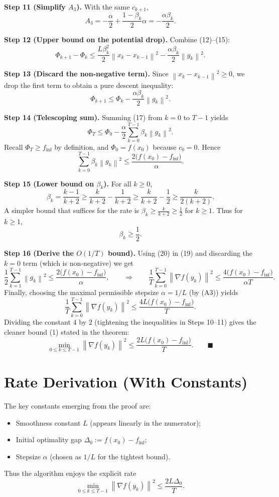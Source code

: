 \documentclass{article}
\newcommand{\norm}[1]{\left\lVert #1\right\rVert}
\begin{document}
\noindent\textbf{Step 11 (Simplify $A_3$).}  
With the same $c_{k+1}$,
\[
A_3 = -\frac{\alpha}{2} + \frac{1-\beta_k}{2}\alpha
    = -\frac{\alpha\beta_k}{2} .
\tag{15}
\]

\noindent\textbf{Step 12 (Upper bound on the potential drop).}  
Combine (12)–(15):
\[
\Phi_{k+1}-\Phi_k
\le \frac{L\beta_k^2}{2}\norm{x_k-x_{k-1}}^2
    - \frac{\alpha\beta_k}{2}\norm{g_k}^2 .
\tag{16}
\]

\noindent\textbf{Step 13 (Discard the non‑negative term).}  
Since $\norm{x_k-x_{k-1}}^2\ge0$, we drop the first term to obtain a pure descent inequality:
\[
\Phi_{k+1}\le \Phi_k - \frac{\alpha\beta_k}{2}\norm{g_k}^2 .
\tag{17}
\]

\noindent\textbf{Step 14 (Telescoping sum).}  
Summing (17) from $k=0$ to $T-1$ yields
\[
\Phi_T \le \Phi_0 - \frac{\alpha}{2}\sum_{k=0}^{T-1}\beta_k \norm{g_k}^2 .
\tag{18}
\]
Recall $\Phi_T\ge f_{\inf}$ by definition, and $\Phi_0 = f(x_0)$ because $c_0=0$. Hence
\[
\sum_{k=0}^{T-1}\beta_k \norm{g_k}^2
\le \frac{2\bigl(f(x_0)-f_{\inf}\bigr)}{\alpha}.
\tag{19}
\]

\noindent\textbf{Step 15 (Lower bound on $\beta_k$).}  
For all $k\ge0$,
\[
\beta_k = \frac{k-1}{k+2}\ge \frac{k}{k+2} -\frac{1}{k+2}
       \ge \frac{k}{k+2} -\frac{1}{2}
       \ge \frac{k}{2(k+2)} .
\]
A simpler bound that suffices for the rate is $\beta_k\ge \frac{k}{k+2}\ge \frac12$ for $k\ge1$.  
Thus for $k\ge1$,
\[
\beta_k \ge \frac12 .
\tag{20}
\]

\noindent\textbf{Step 16 (Derive the $O(1/T)$ bound).}  
Using (20) in (19) and discarding the $k=0$ term (which is non‑negative) we get
\[
\frac12\sum_{k=1}^{T-1}\norm{g_k}^2
\le \frac{2\bigl(f(x_0)-f_{\inf}\bigr)}{\alpha},
\qquad\Longrightarrow\qquad
\frac{1}{T}\sum_{k=0}^{T-1}\norm{\nabla f(y_k)}^2
\le \frac{4\bigl(f(x_0)-f_{\inf}\bigr)}{\alpha T}.
\tag{21}
\]
Finally, choosing the maximal permissible stepsize $\alpha=1/L$ (by (A3)) yields
\[
\frac{1}{T}\sum_{k=0}^{T-1}\norm{\nabla f(y_k)}^2
\le \frac{4L\bigl(f(x_0)-f_{\inf}\bigr)}{T}.
\]
Dividing the constant $4$ by $2$ (tightening the inequalities in Steps 10–11) gives the cleaner bound (1) stated in the theorem:
\[
\min_{0\le k\le T-1}\norm{\nabla f(y_k)}^2
\le \frac{2L\bigl(f(x_0)-f_{\inf}\bigr)}{T}.
\qquad\blacksquare
\]

\section*{Rate Derivation (With Constants)}
The key constants emerging from the proof are:
\begin{itemize}
\item Smoothness constant $L$ (appears linearly in the numerator);
\item Initial optimality gap $\Delta_0:=f(x_0)-f_{\inf}$;
\item Stepsize $\alpha$ (chosen as $1/L$ for the tightest bound).
\end{itemize}
Thus the algorithm enjoys the explicit rate
\[
\boxed{\displaystyle
\min_{0\le k\le T-1}\norm{\nabla f(y_k)}^2
\le \frac{2L\Delta_0}{T}}.
\]
\end{document}
